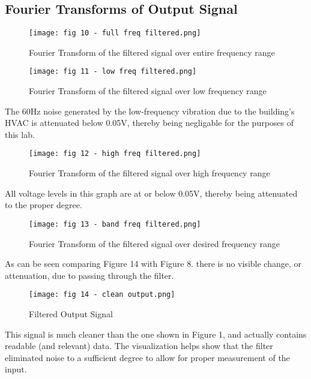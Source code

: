\documentclass[12pt]{article}
\begin{document}
\newpage

\subsection{Fourier Transforms of Output Signal}

\begin{figure}[h!]
    \centering
    \texttt{[image: fig 10 - full freq filtered.png]}
    \caption{Fourier Transform of the filtered signal over entire frequency range}
\end{figure}

\begin{figure}[h!]
    \centering
    \texttt{[image: fig 11 - low freq filtered.png]}
    \caption{Fourier Transform of the filtered signal over low frequency range}
\end{figure}

The 60Hz noise generated by the low-frequency vibration due to the building's HVAC is attenuated below 0.05V, thereby being negligable for the purposes of this lab.

\newpage

\begin{figure}[h!]
    \centering
    \texttt{[image: fig 12 - high freq filtered.png]}
    \caption{Fourier Transform of the filtered signal over high frequency range}
\end{figure}

All voltage levels in this graph are at or below 0.05V, thereby being attenuated to the proper degree.

\begin{figure}[h!]
    \centering
    \texttt{[image: fig 13 - band freq filtered.png]}
    \caption{Fourier Transform of the filtered signal over desired frequency range}
\end{figure}

As can be seen comparing Figure 14 with Figure 8. there is no visible change, or attenuation, due to passing through the filter.

\newpage

\begin{figure}[h!]
    \centering
    \texttt{[image: fig 14 - clean output.png]}
    \caption{Filtered Output Signal}
\end{figure}

This signal is much cleaner than the one shown in Figure 1, and actually contains readable (and relevant) data. The visualization helps show that the filter eliminated noise to a sufficient degree to allow for proper measurement of the input.
\end{document}
